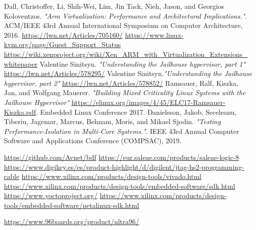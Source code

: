 \documentclass[spanish,12pt,a4paper,oneside]{book}
\begin{document}
\begin{thebibliography}{00}
   Dall, Christoffer, Li, Shih-Wei, Lim, Jin Tack, Nieh, Jason, and Georgios Koloventzos. \emph{"Arm Virtualization: Performance and Architectural Implications."}. ACM/IEEE 43rd Annual International Symposium on Computer Architecture, 2016.
	 \url{https://lwn.net/Articles/705160/}
   \url{https://www.linux-kvm.org/page/Guest_Support_Status}
   \url{https://wiki.xenproject.org/wiki/Xen_ARM_with_Virtualization_Extensions_whitepaper}
   Valentine Sinitsyn. \emph{"Understanding the Jailhouse hypervisor, part 1"} \url{https://lwn.net/Articles/578295/}
   Valentine Sinitsyn.\emph{"Understanding the Jailhouse hypervisor, part 2"} \url{https://lwn.net/Articles/578852/}
   Ramsauer, Ralf, Kiszka, Jan, and Wolfgang Mauerer. \emph{"Building Mixed Criticality Linux Systems with the Jailhouse Hypervisor"} \url{https://elinux.org/images/4/45/ELC17-Ramsauer-Kiszka.pdf}. Embedded Linux Conference 2017.
   Danielsson, Jakob, Seceleanu, Tiberiu, Jagemar, Marcus, Behnam, Moris, and Mikael Sjodin. \emph{"Testing Performance-Isolation in Multi-Core Systems."}. IEEE 43rd Annual Computer Software and Applications Conference (COMPSAC), 2019.



   \url{https://github.com/Avnet/bdf}
   \url{https://eur.saleae.com/products/saleae-logic-8}
   \url{https://www.digikey.es/es/product-highlight/d/digilent/jtag-hs2-programming-cable}
   \url{https://www.xilinx.com/products/design-tools/vivado.html}
  \url{https://www.xilinx.com/products/design-tools/embedded-software/sdk.html}
  \url{https://www.yoctoproject.org/}
  \url{https://www.xilinx.com/products/design-tools/embedded-software/petalinux-sdk.html}

   \url{https://www.96boards.org/product/ultra96/}


\end{thebibliography}
\end{document}
